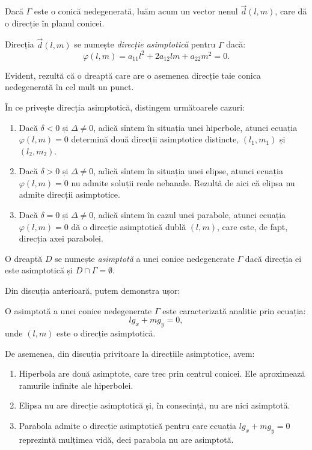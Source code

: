 Dacă $\Gamma$ este o conică nedegenerată, luăm acum un vector nenul
$\vec{d}(l, m)$, care dă o direcție în planul conicei.

\begin{definition}

	Direcția $\vec{d}(l, m)$ se numește \emph{direcție asimptotică} pentru
$\Gamma$ dacă: 
 \[
	\varphi(l, m) = a_{11} l^2 + 2a_{12} lm + a_{22}m^2 = 0.
\]
\end{definition}

Evident, rezultă că o dreaptă care are o asemenea direcție taie conica
nedegenerată în cel mult un punct.

În ce privește direcția asimptotică, distingem următoarele cazuri:

\begin{enumerate}[(1)]
	\item Dacă $\delta < 0$ și $\Delta \neq 0$, adică sîntem în situația unei
hiperbole, atunci ecuația $\varphi(l, m) = 0$ determină două direcții 
asimptotice distincte, $(l_1, m_1)$ și $(l_2, m_2)$.
    \item Dacă $\delta > 0$ și $\Delta \neq 0$, adică sîntem în situația unei
elipse, atunci ecuația $\varphi(l, m) = 0$ nu admite soluții reale nebanale.
Rezultă de aici că elipsa nu admite direcții asimptotice.
    \item Dacă $\delta = 0$ și $\Delta \neq 0$, adică sîntem în cazul unei
parabole, atunci ecuația $\varphi(l, m) = 0$ dă o direcție asimptotică dublă
$(l, m)$, care este, de fapt, direcția axei parabolei.
\end{enumerate}

\begin{definition}
	O dreaptă $D$ se numește \emph{asimptotă} a unei conice nedegenerate 
$\Gamma$ dacă direcția ei este asimptotică și $D \cap \Gamma = \emptyset$.
\end{definition}

Din discuția anterioară, putem demonstra ușor:

\begin{theorem}
	O asimptotă a unei conice nedegenerate $\Gamma$ este caracterizată analitic
prin ecuația: 
 \[
	l g_x + m g_y = 0,
\]
unde $(l, m)$ este o direcție asimptotică.
\end{theorem}

De asemenea, din discuția privitoare la direcțiile asimptotice, avem:
\begin{enumerate}[(1)]
	\item Hiperbola are două asimptote, care trec prin centrul conicei.
Ele aproximează ramurile infinite ale hiperbolei.
    \item Elipsa nu are direcție asimptotică și, în consecință, nu are nici
asimptotă.
    \item Parabola admite o direcție asimptotică pentru care ecuația
$l g_x + m g_y = 0$ reprezintă mulțimea vidă, deci parabola nu are asimptotă.
\end{enumerate}

